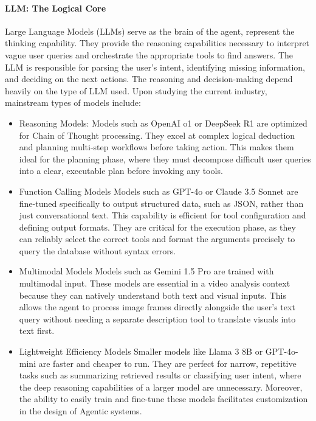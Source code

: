 \paragraph*{LLM: The Logical Core}
Large Language Models (LLMs) serve as the brain of the agent, represent the thinking capability. They provide the reasoning capabilities necessary to interpret vague user queries and orchestrate the appropriate tools to find answers. The LLM is responsible for parsing the user's intent, identifying missing information, and deciding on the next actions. The reasoning and decision-making depend heavily on the type of LLM used. Upon studying the current industry, mainstream types of models include:
\begin{itemize}
    \item {Reasoning Models: }
Models such as OpenAI o1 or DeepSeek R1 are optimized for Chain of Thought processing. They excel at complex logical deduction and planning multi-step workflows before taking action. This makes them ideal for the planning phase, where they must decompose difficult user queries into a clear, executable plan before invoking any tools.
    \item{Function Calling Models}
Models such as GPT-4o or Claude 3.5 Sonnet are fine-tuned specifically to output structured data, such as JSON, rather than just conversational text. This capability is efficient for tool configuration and defining output formats. They are critical for the execution phase, as they can reliably select the correct tools and format the arguments precisely to query the database without syntax errors.
    \item{Multimodal Models}
    Models such as Gemini 1.5 Pro are trained with multimodal input. These models are essential in a video analysis context because they can natively understand both text and visual inputs. This allows the agent to process image frames directly alongside the user's text query without needing a separate description tool to translate visuals into text first.
    
    \item{Lightweight Efficiency Models}
    Smaller models like Llama 3 8B or GPT-4o-mini are faster and cheaper to run. They are perfect for narrow, repetitive tasks such as summarizing retrieved results or classifying user intent, where the deep reasoning capabilities of a larger model are unnecessary. Moreover, the ability to easily train and fine-tune these models facilitates customization in the design of Agentic systems.
\end{itemize}



